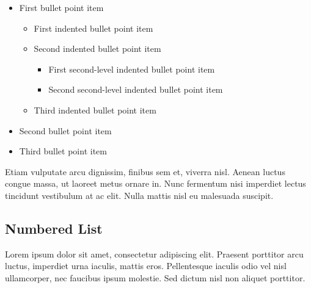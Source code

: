 \documentclass[
	a4paper, %
	12pt, %
]{include/CSSullivanBusinessReport}
\begin{document}
\begin{itemize}
	\item First bullet point item
	\begin{itemize}
		\item First indented bullet point item
		\item Second indented bullet point item
		\begin{itemize}
			\item First second-level indented bullet point item
			\item Second second-level indented bullet point item
		\end{itemize}
		\item Third indented bullet point item
	\end{itemize}
	\item Second bullet point item
	\item Third bullet point item
\end{itemize}

Etiam vulputate arcu dignissim, finibus sem et, viverra nisl. Aenean luctus congue massa, ut laoreet metus ornare in. Nunc fermentum nisi imperdiet lectus tincidunt vestibulum at ac elit. Nulla mattis nisl eu malesuada suscipit.


\subsection{Numbered List}

Lorem ipsum dolor sit amet, consectetur adipiscing elit. Praesent porttitor arcu luctus, imperdiet urna iaculis, mattis eros. Pellentesque iaculis odio vel nisl ullamcorper, nec faucibus ipsum molestie. Sed dictum nisl non aliquet porttitor.
\end{document}
